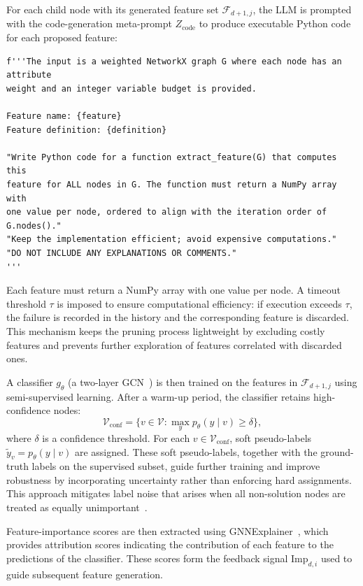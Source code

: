 For each child node with its generated feature set $\mathcal{F}_{d+1,j}$, the LLM is
prompted with the code-generation meta-prompt $Z_{\text{code}}$ to produce executable
Python code for each proposed feature: \newpage
\begin{verbatim}
f'''The input is a weighted NetworkX graph G where each node has an attribute
weight and an integer variable budget is provided.

Feature name: {feature}
Feature definition: {definition}

"Write Python code for a function extract_feature(G) that computes this
feature for ALL nodes in G. The function must return a NumPy array with
one value per node, ordered to align with the iteration order of G.nodes()."
"Keep the implementation efficient; avoid expensive computations."
"DO NOT INCLUDE ANY EXPLANATIONS OR COMMENTS."
'''
\end{verbatim}
Each feature must return a NumPy array with one value per node. A timeout threshold $\tau$ is imposed to ensure computational efficiency: if
execution exceeds $\tau$, the failure is recorded in the history and the corresponding
feature is discarded. This mechanism keeps the pruning process lightweight by excluding
costly features and prevents further exploration of features correlated with discarded
ones.

A classifier $g_\theta$ (a two-layer GCN~\citep{kipf2016semi}) is then trained on the
features in $\mathcal{F}_{d+1,j}$ using semi-supervised learning. After a warm-up period,
the classifier retains high-confidence nodes:
\[
\mathcal{V}_{\text{conf}} = \{v \in \mathcal{V} : \max_y p_\theta(y \mid v) \geq \delta\},
\]
where $\delta$ is a confidence threshold. For each $v \in \mathcal{V}_{\text{conf}}$, soft
pseudo-labels $\tilde{y}_v = p_\theta(y \mid v)$ are assigned. These soft pseudo-labels,
together with the ground-truth labels on the supervised subset, guide further training and
improve robustness by incorporating uncertainty rather than enforcing hard assignments.
This approach mitigates label noise that arises when all non-solution nodes are treated as
equally unimportant~\citep{manchanda2020gcomb}.

Feature-importance scores are then extracted using
GNNExplainer~\citep{ying2019gnnexplainer}, which provides attribution scores indicating
the contribution of each feature to the predictions of the classifier. These scores form the
feedback signal $\text{Imp}_{d,i}$ used to guide subsequent feature generation.

